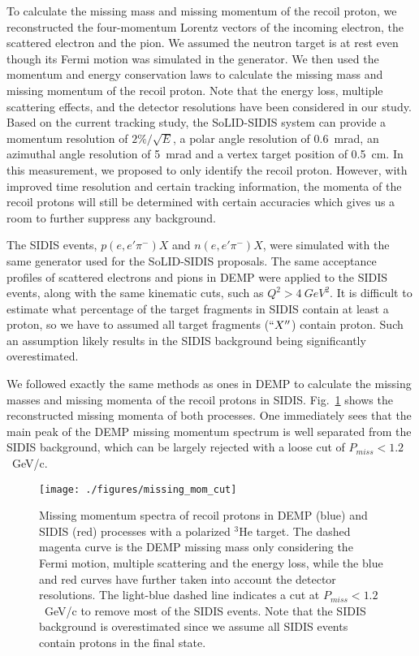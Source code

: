 To calculate the missing mass and missing momentum of the recoil proton, we
reconstructed the four-momentum Lorentz vectors of the incoming electron, the
scattered electron and the pion.  We assumed the neutron target is at rest even
though its Fermi motion was simulated in the generator.  We then used the
momentum and energy conservation laws to calculate the missing mass and missing
momentum of the recoil proton.  Note that the energy loss, multiple scattering
effects, and the detector resolutions have been considered in our study.  Based
on the current tracking study, the SoLID-SIDIS system can provide a momentum
resolution of $2\%/\sqrt{E}$, a polar angle resolution of 0.6~mrad, an
azimuthal angle resolution of 5~mrad and a vertex target position of 0.5~cm.
In this measurement, we proposed to only identify the recoil proton. However,
with improved time resolution and certain tracking information, the momenta of
the recoil protons will still be determined with certain accuracies which gives
us a room to further suppress any background.

The SIDIS events, $p(e,e'\pi^{-})X$ and $n(e,e'\pi^{-})X$, were simulated with
the same generator used for the SoLID-SIDIS proposals.  The same acceptance
profiles of scattered electrons and pions in DEMP were applied to the SIDIS
events, along with the same kinematic cuts, such as $Q^2>4~GeV^2$.  It is
difficult to estimate what percentage of the target fragments in SIDIS contain
at least a proton, so we have to assumed all target fragments ($``X''$) contain
proton. Such an assumption likely results in the SIDIS background being
significantly overestimated.

We followed exactly the same methods as ones in DEMP to calculate the missing
masses and missing momenta of the recoil protons in SIDIS.
Fig.~\ref{fig:missing_mom} shows the reconstructed missing momenta of both
processes.  One immediately sees that the main peak of the DEMP missing
momentum spectrum is well separated from the SIDIS background, which can be
largely rejected with a loose cut of $P_{miss}<1.2$~GeV/c.
\begin{figure}[!ht]
\begin{center}
\texttt{[image: ./figures/missing\_mom\_cut]}
\caption[Missing Momentum]{\footnotesize{Missing momentum spectra of recoil
    protons in DEMP (blue) and SIDIS (red) processes with a polarized $^{3}$He
    target. The dashed magenta curve is the DEMP missing mass only considering
    the Fermi motion, multiple scattering and the energy loss, while the blue
    and red curves have further taken into account the detector
    resolutions. The light-blue dashed line indicates a cut at
    $P_{miss}<1.2$~GeV/c to remove most of the SIDIS events.  Note that the
    SIDIS background is overestimated since we assume all SIDIS events contain
    protons in the final state. }}
  \label{fig:missing_mom}
  \end{center}
\end{figure}

